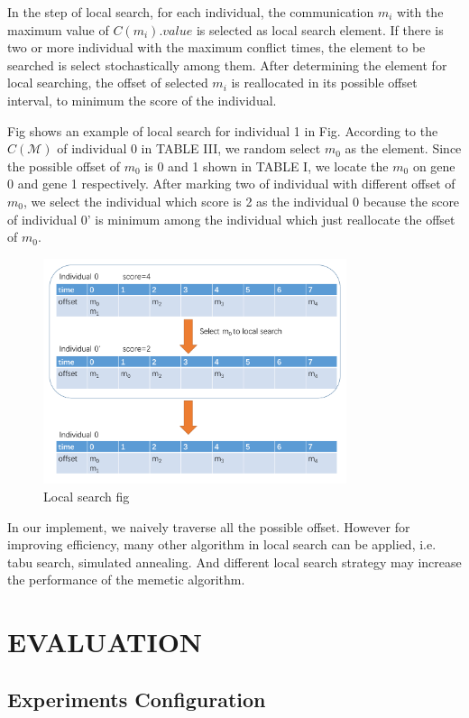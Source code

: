 \documentclass[conference]{IEEEtran}
\begin{document}
In the step of local search, for each individual, the communication $m_i$ with the maximum value of $C(m_i).value$ is selected as local search element. If there is two or more individual with the maximum conflict times, the element to be searched is select stochastically among them. After determining the element for local searching, the offset of selected $m_i$ is reallocated in its possible offset interval, to minimum the score of the individual.

Fig shows an example of local search for individual 1 in Fig. According to the $C(\mathcal{M})$ of individual 0 in TABLE III, we random select $m_0$ as the element. Since the possible offset of $m_0$ is 0 and 1 shown in TABLE I, we locate the $m_0$ on gene 0 and gene 1 respectively. After marking two of individual with different offset of $m_0$, we select the individual which score is 2 as the individual 0 because the score of individual 0' is minimum among the individual which just reallocate the offset of $m_0$.
\begin{figure}[!t]
	\centering
	\includegraphics[width=3.5in]{picture/local.pdf}
	\caption{Local search fig}
	\label{Local search fig}
\end{figure}

In our implement, we naively traverse all the possible offset. However for improving efficiency, many other algorithm in local search can be applied, i.e. tabu search, simulated annealing. And different local search strategy may increase the performance of the memetic algorithm.

\section{EVALUATION}

\subsection{Experiments Configuration}
\end{document}
